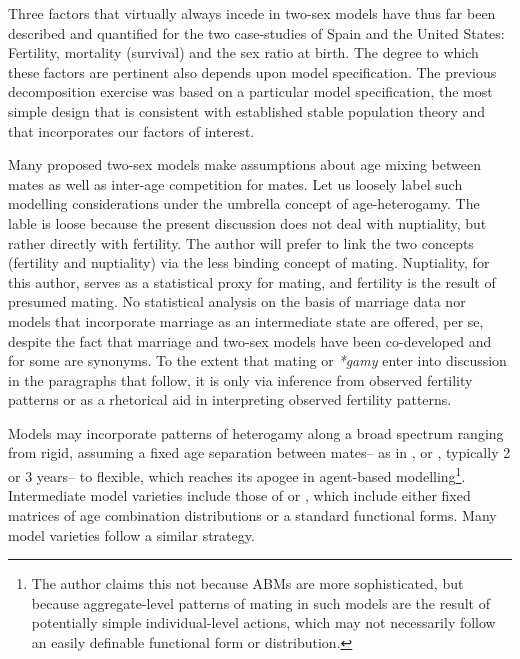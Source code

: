 Three factors that virtually always incede in two-sex models have
thus far been described and quantified for the two case-studies of Spain and
the United States: Fertility, mortality (survival) and the sex ratio at birth.
The degree to which these factors are pertinent also depends upon model 
specification. The previous decomposition exercise was based on a particular
model specification, the most simple design that is consistent with
established stable population theory and that incorporates our factors of
interest. 

Many proposed two-sex models make assumptions about age mixing between
mates as well as inter-age competition for mates. Let us loosely 
label such modelling considerations under the umbrella concept of
age-heterogamy. The lable is loose because the present
discussion does not deal with nuptiality, but rather directly with fertility.
The author will prefer to link the two concepts (fertility and nuptiality) via
the less binding concept of mating. Nuptiality, for this author, serves as a
statistical proxy for mating, and fertility is the result of presumed mating. No 
statistical analysis on the basis of
marriage data nor models that incorporate marriage as an intermediate state are
offered, per se, despite the fact that marriage and two-sex models have
been co-developed and for some are synonyms. To the extent that mating or
\textit{*gamy} enter into discussion in the paragraphs that follow, it is only
via inference from observed fertility patterns or as a rhetorical aid in interpreting observed fertility patterns.

Models may incorporate patterns of heterogamy along a
broad spectrum ranging from rigid, assuming a fixed age separation between mates--
 as in \citet{cabre1997tortulos}, \citet{karmel1947relations} or \citet{akers1967measuring}, 
 typically 2 or 3 years-- to flexible, which reaches its apogee in agent-based
modelling\footnote{The author claims this not because ABMs are more
sophisticated, but because aggregate-level patterns of mating in such models are
the result of potentially simple individual-level actions, which may not
necessarily follow an easily definable functional form or distribution.}.
Intermediate model varieties include those of \citet[e.g.]{gupta1972two} or
\citet{schoen1981harmonic}, which include either fixed matrices of age
combination distributions or a standard functional forms. Many model varieties
follow a similar strategy.  

